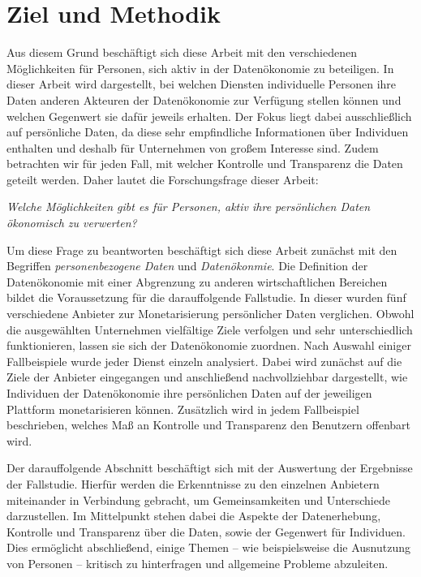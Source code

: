 \section{Ziel und Methodik}
Aus diesem Grund beschäftigt sich diese Arbeit mit den verschiedenen Möglichkeiten für Personen, sich aktiv in der Datenökonomie zu beteiligen. In dieser Arbeit wird dargestellt, bei welchen Diensten individuelle Personen ihre Daten anderen Akteuren der Datenökonomie zur Verfügung stellen können und welchen Gegenwert sie dafür jeweils erhalten. Der Fokus liegt dabei ausschließlich auf persönliche Daten, da diese sehr empfindliche Informationen über Individuen enthalten und deshalb für Unternehmen von großem Interesse sind. Zudem betrachten wir für jeden Fall, mit welcher Kontrolle und Transparenz die Daten geteilt werden. Daher lautet die Forschungsfrage dieser Arbeit:

\begin{center}
\textit{Welche Möglichkeiten gibt es für Personen, aktiv ihre persönlichen Daten ökonomisch zu verwerten?}
\end{center}

\noindent Um diese Frage zu beantworten beschäftigt sich diese Arbeit zunächst mit den Begriffen \textit{personenbezogene Daten} und \textit{Datenökonmie}. Die Definition der Datenökonomie mit einer Abgrenzung zu anderen wirtschaftlichen Bereichen bildet die Voraussetzung für die darauffolgende Fallstudie. In dieser wurden fünf verschiedene Anbieter zur Monetarisierung persönlicher Daten verglichen. Obwohl die ausgewählten Unternehmen vielfältige Ziele verfolgen und sehr unterschiedlich funktionieren, lassen sie sich der Datenökonomie zuordnen. Nach Auswahl einiger Fallbeispiele wurde jeder Dienst einzeln analysiert. Dabei wird zunächst auf die Ziele der Anbieter eingegangen und anschließend nachvollziehbar dargestellt, wie Individuen der Datenökonomie ihre persönlichen Daten auf der jeweiligen Plattform monetarisieren können. Zusätzlich wird in jedem Fallbeispiel beschrieben, welches Maß an Kontrolle und Transparenz den Benutzern offenbart wird. \newline

\noindent Der darauffolgende Abschnitt beschäftigt sich mit der Auswertung der Ergebnisse der Fallstudie. Hierfür werden die Erkenntnisse zu den einzelnen Anbietern miteinander in Verbindung gebracht, um Gemeinsamkeiten und Unterschiede darzustellen. Im Mittelpunkt stehen dabei die Aspekte der Datenerhebung, Kontrolle und Transparenz über die Daten, sowie der Gegenwert für Individuen. Dies ermöglicht abschließend, einige Themen -- wie beispielsweise die Ausnutzung von Personen -- kritisch zu hinterfragen und allgemeine Probleme abzuleiten.
